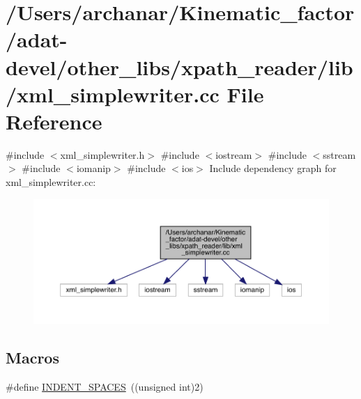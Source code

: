 \hypertarget{adat-devel_2other__libs_2xpath__reader_2lib_2xml__simplewriter_8cc}{}\section{/\+Users/archanar/\+Kinematic\+\_\+factor/adat-\/devel/other\+\_\+libs/xpath\+\_\+reader/lib/xml\+\_\+simplewriter.cc File Reference}
\label{adat-devel_2other__libs_2xpath__reader_2lib_2xml__simplewriter_8cc}
{\ttfamily \#include $<$xml\+\_\+simplewriter.\+h$>$}\newline
{\ttfamily \#include $<$iostream$>$}\newline
{\ttfamily \#include $<$sstream$>$}\newline
{\ttfamily \#include $<$iomanip$>$}\newline
{\ttfamily \#include $<$ios$>$}\newline
Include dependency graph for xml\+\_\+simplewriter.\+cc\+:
\nopagebreak
\begin{figure}[H]
\begin{center}
\leavevmode
\includegraphics[width=350pt]{dd/d56/adat-devel_2other__libs_2xpath__reader_2lib_2xml__simplewriter_8cc__incl}
\end{center}
\end{figure}
\subsection*{Macros}
\begin{DoxyCompactItemize}
\item 
\#define \mbox{\hyperlink{adat-devel_2other__libs_2xpath__reader_2lib_2xml__simplewriter_8cc_ad3b6821be9e4586b39163dad279459c4}{I\+N\+D\+E\+N\+T\+\_\+\+S\+P\+A\+C\+ES}}~((unsigned int)2)
\end{DoxyCompactItemize}


